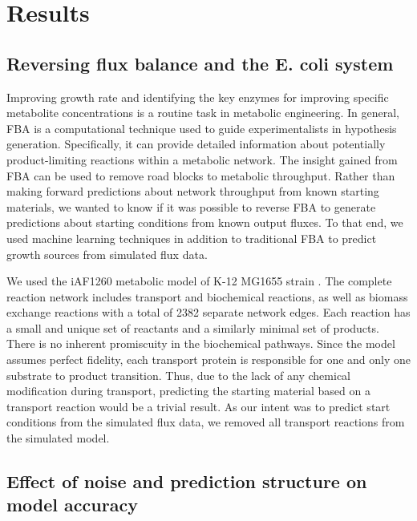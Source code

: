 \documentclass[12pt]{article}
\begin{document}
\section*{Results}
\subsection*{Reversing flux balance and the E. coli system}

Improving growth rate and identifying the key enzymes for improving specific metabolite concentrations is a routine task in metabolic engineering. In general, FBA is a computational technique used to guide experimentalists in hypothesis generation. Specifically, it can provide detailed information about potentially product-limiting reactions within a metabolic network. The insight gained from FBA can be used to remove  road blocks to metabolic throughput. Rather than making forward predictions about network throughput from known starting materials, we wanted to know if it was possible to reverse FBA to generate predictions about starting conditions from known output fluxes. To that end, we used machine learning techniques in addition to traditional FBA to predict growth sources from simulated flux data.

We used the iAF1260 metabolic model of K-12 MG1655 strain \cite{Schellenbergeretal2010}. The complete reaction network includes transport and biochemical reactions, as well as biomass exchange reactions with a total of 2382 separate network edges. Each reaction has a small and unique set of reactants and a similarly minimal set of products. There is no inherent promiscuity in the biochemical pathways. Since the model assumes perfect fidelity, each transport protein is responsible for one and only one substrate to product transition. Thus, due to the lack of any chemical modification during transport, predicting the starting material based on a transport reaction would be a trivial result. As our intent was to predict start conditions from the simulated flux data, we removed all transport reactions from the simulated model. 

\subsection*{Effect of noise and prediction structure on model accuracy}
\end{document}
